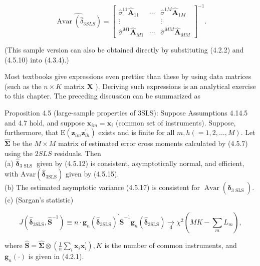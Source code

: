 \documentclass[10pt]{article}
\begin{document}
\[
\widehat{\operatorname{Avar}\left(\hat{\delta}_{3 S L S}\right)}=\left[\begin{array}{ccc}
\hat{\sigma}^{11} \widehat{\mathbf{A}}_{11} & \cdots & \hat{\sigma}^{1 M} \widehat{\mathbf{A}}_{1 M}  \tag{4.5.17}\\
\vdots & & \vdots \\
\hat{\sigma}^{M 1} \widehat{\mathbf{A}}_{M 1} & \cdots & \hat{\sigma}^{M M} \widehat{\mathbf{A}}_{M M}
\end{array}\right]^{-1} .
\]

(This sample version can also be obtained directly by substituting (4.2.2) and (4.5.10) into (4.3.4).)

Most textbooks give expressions even prettier than these by using data matrices (such as the $n \times K$ matrix $\mathbf{X}$ ). Deriving such expressions is an analytical exercise to this chapter. The preceding discussion can be summarized as

Proposition 4.5 (large-sample properties of 3SLS): Suppose Assumptions 4.14.5 and 4.7 hold, and suppose $\mathbf{x}_{i m}=\mathbf{x}_{i}$ (common set of instruments). Suppose, furthermore, that $\mathrm{E}\left(\mathbf{z}_{i m} \mathbf{z}_{i h}^{\prime}\right)$ exists and is finite for all $m, h(=1,2, \ldots, M)$. Let $\widehat{\mathbf{\Sigma}}$ be the $M \times M$ matrix of estimated error cross moments calculated by (4.5.7) using the $2 S L S$ residuals. Then\\
(a) $\hat{\boldsymbol{\delta}}_{3 \text { SLS }}$ given by (4.5.12) is consistent, asymptotically normal, and efficient, with $\mathrm{Avar}\left(\hat{\boldsymbol{\delta}}_{3 \mathrm{SLS}}\right)$ given by (4.5.15).\\
(b) The estimated asymptotic variance (4.5.17) is consistent for $\operatorname{Avar}\left(\hat{\boldsymbol{\delta}}_{3 \text { SLS }}\right)$.\\
(c) (Sargan's statistic)

$$
J\left(\hat{\boldsymbol{\delta}}_{3 \mathrm{SLS}}, \widehat{\mathbf{S}}^{-1}\right) \equiv n \cdot \mathbf{g}_{n}\left(\hat{\boldsymbol{\delta}}_{3 \mathrm{SLS}}\right)^{\prime} \widehat{\mathbf{S}}^{-1} \mathbf{g}_{n}\left(\hat{\boldsymbol{\delta}}_{3 \mathrm{SLS}}\right) \underset{\mathrm{d}}{\rightarrow} \chi^{2}\left(M K-\sum_{m} L_{m}\right),
$$

where $\widehat{\mathbf{S}}=\widehat{\mathbf{\Sigma}} \otimes\left(\frac{1}{n} \sum_{i} \mathbf{x}_{i} \mathbf{x}_{i}^{\prime}\right), K$ is the number of common instruments, and $\mathbf{g}_{n}(\cdot)$ is given in (4.2.1).
\end{document}
